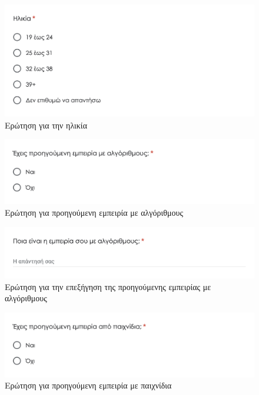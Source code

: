 \begin{figure}[H]
    \centering
    \includegraphics[width=0.8\linewidth]{sections/appendices/b/images/survey_age}
    \caption{Ερώτηση για την ηλικία}
    \label{fig:survey_age}
\end{figure}


\begin{figure}[H]
    \centering
    \includegraphics[width=0.8\linewidth]{sections/appendices/b/images/survey_algorithm_experience}
    \caption{Ερώτηση για προηγούμενη εμπειρία με αλγόριθμους}
    \label{fig:survey_algorithm_experience}
\end{figure}

\begin{figure}[H]
    \centering
    \includegraphics[width=0.8\linewidth]{sections/appendices/b/images/survey_algorithm_experience_input}
    \caption{Ερώτηση για την επεξήγηση της προηγούμενης εμπειρίας με αλγόριθμους}
    \label{fig:survey_algorithm_experience_input}
\end{figure}

\begin{figure}[H]
    \centering
    \includegraphics[width=0.8\linewidth]{sections/appendices/b/images/survey_game_experience}
    \caption{Ερώτηση για προηγούμενη εμπειρία με παιχνίδια}
    \label{fig:survey_game_experience}
\end{figure}

